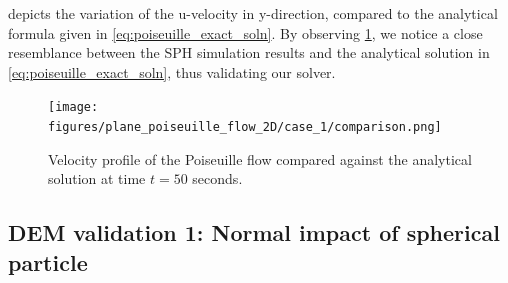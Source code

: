 \documentclass[preprint,12pt]{elsarticle}
\begin{document}
 depicts the variation of the u-velocity in
y-direction, compared to the analytical formula given in
\cref{eq:poiseuille_exact_soln}.  By observing
\cref{fig:poiseuille_soln_graph}, we notice a close resemblance between the
SPH simulation results and the analytical solution in
\cref{eq:poiseuille_exact_soln}, thus validating our solver.
\begin{figure}[!htpb]
  \centering
  \texttt{[image: figures/plane\_poiseuille\_flow\_2D/case\_1/comparison.png]}
  \caption{Velocity profile of the Poiseuille flow compared against the
    analytical solution at time $t=50$ seconds.}
  \label{fig:poiseuille_soln_graph}
\end{figure}






\FloatBarrier%
\subsection{DEM validation 1: Normal impact of spherical particle}
\label{sec:DEM_validation_1_normal_impact}
\end{document}
